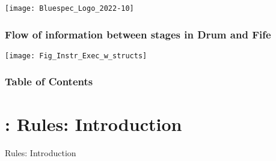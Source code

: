 


\date{L13: {\BSV}: Rules and their semantics}





\begin{frame}
 \titlepage

 \begin{center}
  \texttt{[image: Bluespec\_Logo\_2022-10]}
 \end{center}

\end{frame}





\begin{frame}
\frametitle{Flow of information between stages in Drum and Fife}

\label{Slide_Instr_Steps}

\footnotesize

\begin{center}
 \texttt{[image: Fig\_Instr\_Exec\_w\_structs]}
\end{center}

\end{frame}


\begin{frame}
\frametitle{Table of Contents}

\tableofcontents

\end{frame}


\section{{\BSV}: Rules: Introduction}

\begin{frame}

\begin{center}
  {\LARGE Rules: Introduction}
\end{center}

\end{frame}

